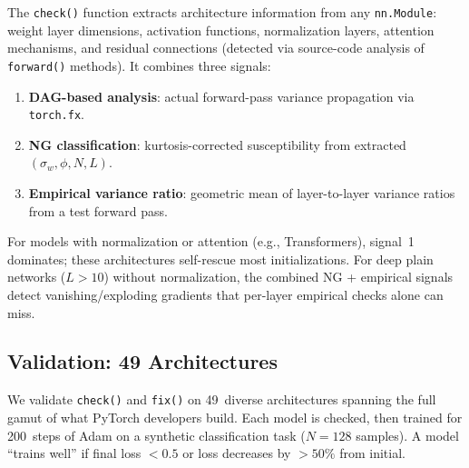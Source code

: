 \documentclass[10pt]{article}
\begin{document}
The \texttt{check()} function extracts architecture information from any \texttt{nn.Module}: weight layer dimensions, activation functions, normalization layers, attention mechanisms, and residual connections (detected via source-code analysis of \texttt{forward()} methods). It combines three signals:

\begin{enumerate}
\item \textbf{DAG-based analysis}: actual forward-pass variance propagation via \texttt{torch.fx}.
\item \textbf{NG classification}: kurtosis-corrected susceptibility from extracted $(\sigma_w, \phi, N, L)$.
\item \textbf{Empirical variance ratio}: geometric mean of layer-to-layer variance ratios from a test forward pass.
\end{enumerate}

For models with normalization or attention (e.g., Transformers), signal~1 dominates; these architectures self-rescue most initializations. For deep plain networks ($L > 10$) without normalization, the combined NG + empirical signals detect vanishing/exploding gradients that per-layer empirical checks alone can miss.

\subsection{Validation: 49 Architectures}

We validate \texttt{check()} and \texttt{fix()} on 49~diverse architectures spanning the full gamut of what PyTorch developers build. Each model is checked, then trained for 200~steps of Adam on a synthetic classification task ($N=128$ samples). A model ``trains well'' if final loss $< 0.5$ or loss decreases by $> 50\%$ from initial.
\end{document}
